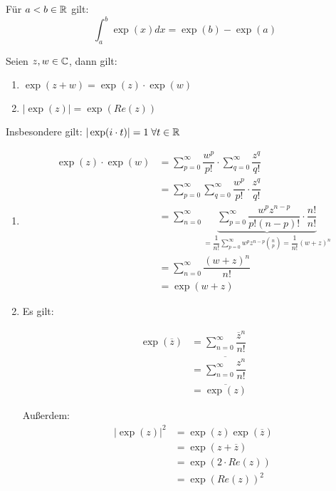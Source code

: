 \documentclass[main.tex]{subfiles}
\begin{document}
\begin{Korollar}
  Für $a < b \in \mathbb{R}$ gilt:
  $$\int_a^b \exp(x) dx = \exp(b) - \exp(a)$$
\end{Korollar}

\begin{Theorem}
  Seien $z,w \in \mathbb{C}$, dann gilt:
  \begin{enumerate}
    \item $\exp(z+w) = \exp(z)\cdot \exp(w)$
    \item $|\exp(z)| = \exp(Re(z))$
  \end{enumerate}
  Insbesondere gilt: $|\exp(i \cdot t)| = 1 \;\forall t \in \mathbb{R}$
\end{Theorem}

\begin{Beweis}
  \begin{enumerate}
    \item
        $$\begin{aligned}
        \exp(z)\cdot \exp(w) &=
        \sum \limits_{p=0}^\infty \dfrac{w^p}{p!} \cdot \sum \limits_{q=0}^\infty \dfrac{z^q}{q!}\\
        &= \sum \limits_{p=0}^\infty \sum \limits_{q=0}^\infty \dfrac{w^p}{p!} \cdot \dfrac{z^q}{q!}\\
        &= \sum \limits_{n=0}^\infty \underbrace{\sum \limits_{p=0}^\infty \dfrac{w^p z^{n-p}}{p!(n-p)!} \cdot \dfrac{n!}{n!}}_{= \dfrac{1}{n!} \sum \limits_{p=0}^\infty w^p z^{n -p} {n \choose p} = \dfrac{1}{n!}(w+z)^n}\\
        &= \sum \limits_{n=0}^\infty \dfrac{(w+z)^n}{n!}\\
        &= \exp(w+z)
      \end{aligned}$$
    \item Es gilt:\\
      \begin{minipage}{0.45\textwidth}
        $$\begin{aligned}
          \exp(\overline{z}) &= \sum \limits_{n=0}^\infty \dfrac{\overline{z}^n}{n!}\\
          &= \overline{\sum \limits_{n=0}^\infty \dfrac{z^n}{n!}}\\
          &= \overline{\exp(z)}
        \end{aligned}$$
      \end{minipage}
      \begin{minipage}{0.45\textwidth}
        Außerdem:
        $$\begin{aligned}
          |\exp(z)|^2 &= \exp(z)\exp(\overline{z})\\
          &= \exp(z + \overline{z})\\
          &= \exp(2\cdot Re(z))\\
          &= \exp(Re(z))^2
      \end{aligned}$$
      \end{minipage}
  \end{enumerate}
\end{Beweis}
\end{document}
